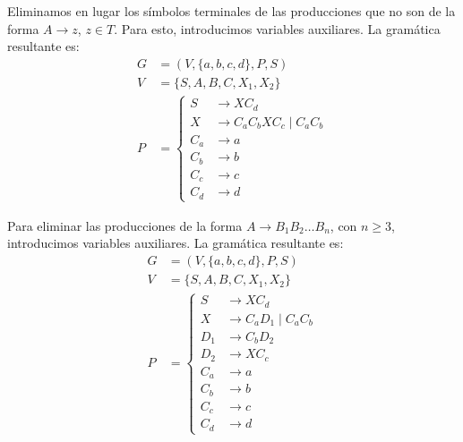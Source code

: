 \begin{ejercicio}
    Eliminamos en lugar los símbolos terminales de las producciones que no son de la forma $A\to z$, $z\in T$. Para esto, introducimos variables auxiliares. La gramática resultante es:
    \begin{equation*}
        \begin{aligned}
            G &= (V,\{a,b,c,d\},P,S) \\
            V &= \{ S, A, B, C, X_1, X_2 \} \\
            P &= \left\{
                \begin{aligned}
                    S &\rightarrow XC_d\\
                    X &\rightarrow C_aC_bXC_c \mid C_aC_b\\
                    C_a &\rightarrow a\\
                    C_b &\rightarrow b\\
                    C_c &\rightarrow c\\
                    C_d &\rightarrow d
                \end{aligned}
            \right.
        \end{aligned}
    \end{equation*}

    Para eliminar las producciones de la forma $A\to B_1B_2\ldots B_n$, con $n\geq 3$, introducimos variables auxiliares. La gramática resultante es:
    \begin{equation*}
        \begin{aligned}
            G &= (V,\{a,b,c,d\},P,S) \\
            V &= \{ S, A, B, C, X_1, X_2 \} \\
            P &= \left\{
                \begin{aligned}
                    S &\rightarrow XC_d\\
                    X &\rightarrow C_aD_1 \mid C_aC_b\\
                    D_1 &\rightarrow C_bD_2\\
                    D_2 &\rightarrow XC_c\\
                    C_a &\rightarrow a\\
                    C_b &\rightarrow b\\
                    C_c &\rightarrow c\\
                    C_d &\rightarrow d
                \end{aligned}
            \right.
        \end{aligned}
    \end{equation*}
\end{ejercicio}

